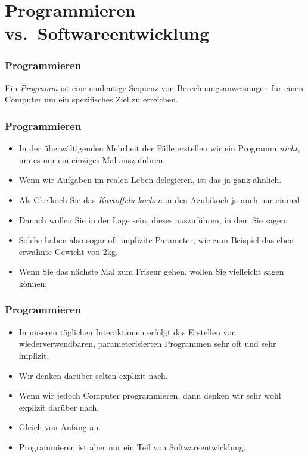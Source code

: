 \documentclass[aspectratio=169,mathserif,notheorems]{beamer}%
\begin{document}
\section{Programmieren vs.\ Softwareentwicklung}%
%
\begin{frame}%
\frametitle{Programmieren}%
%
\begin{definition*}[Programm]%
Ein \emph{Programm} ist eine eindeutige Sequenz von Berechnungsanweisungen für einen Computer um ein spezifisches Ziel zu erreichen.%
\end{definition*}%
%
%
%
\end{frame}%
%
\begin{frame}%
\frametitle{Programmieren}%
\begin{itemize}%
\item In der überwältigenden Mehrheit der Fälle erstellen wir ein Programm \emph{nicht}, um es nur ein einziges Mal auszuführen.%
\item<2-> Wenn wir Aufgaben im realen Leben delegieren, ist das ja ganz ähnlich.
\item<3-> Als Chefkoch  Sie das  \emph{Kartoffeln kochen} in den Azubikoch ja auch nur einmal 
\item<4-> Danach wollen Sie in der Lage sein, dieses  auszuführen, in dem Sie sagen:~
\item<5-> Solche  haben also sogar oft implizite Parameter, wie zum Beispiel das eben erwähnte Gewicht von 2kg.%
\item<6-> Wenn Sie das nächste Mal zum Friseur gehen, wollen Sie vielleicht sagen können:~%
\end{itemize}%
\end{frame}%
%
\begin{frame}%
\frametitle{Programmieren}%
\begin{itemize}%
\item In unseren täglichen Interaktionen erfolgt das Erstellen von wiederverwendbaren, parameterisierten Programmen sehr oft und sehr implizit.%
\item<2-> Wir denken darüber selten explizit nach.%
\item<3-> Wenn wir jedoch Computer programmieren, dann denken wir sehr wohl explizit darüber nach.%
\item<4-> Gleich von Anfang an.%
\item<5-> \alert{Programmieren ist aber nur ein Teil von Softwareentwicklung}.
\end{itemize}%
\end{frame}%
\end{document}
